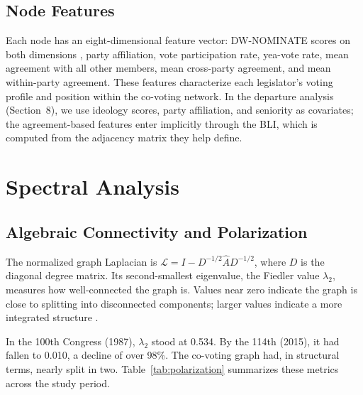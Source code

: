 \documentclass[12pt, a4paper]{article}
\begin{document}
\subsection{Node Features}

Each node has an eight-dimensional feature vector: DW-NOMINATE scores on both dimensions \citep{poole2017}, party affiliation, vote participation rate, yea-vote rate, mean agreement with all other members, mean cross-party agreement, and mean within-party agreement. These features characterize each legislator's voting profile and position within the co-voting network. In the departure analysis (Section~8), we use ideology scores, party affiliation, and seniority as covariates; the agreement-based features enter implicitly through the BLI, which is computed from the adjacency matrix they help define.

\section{Spectral Analysis}

\subsection{Algebraic Connectivity and Polarization}

The normalized graph Laplacian is $\mathcal{L} = I - D^{-1/2} \hat{A} D^{-1/2}$, where $D$ is the diagonal degree matrix. Its second-smallest eigenvalue, the Fiedler value $\lambda_2$, measures how well-connected the graph is. Values near zero indicate the graph is close to splitting into disconnected components; larger values indicate a more integrated structure \citep{fiedler1973}.

In the 100th Congress (1987), $\lambda_2$ stood at 0.534. By the 114th (2015), it had fallen to 0.010, a decline of over 98\%. The co-voting graph had, in structural terms, nearly split in two. Table~\ref{tab:polarization} summarizes these metrics across the study period.
\end{document}
